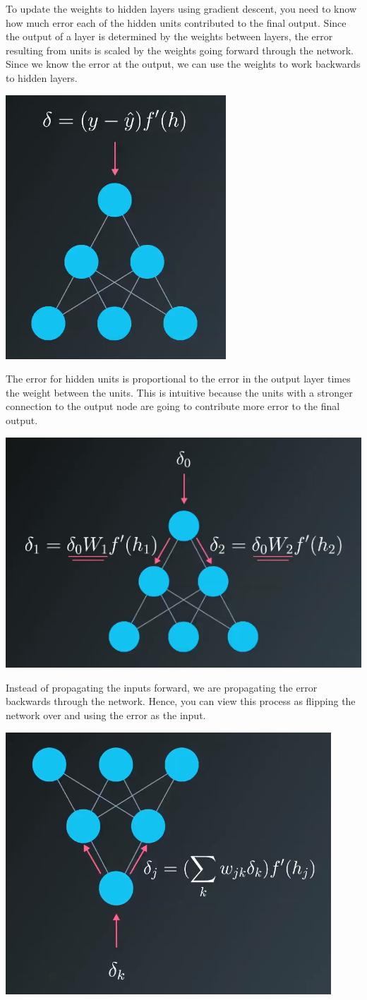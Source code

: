 To update the weights to hidden layers using gradient descent, you need to know how much error each of the hidden units contributed to the final output. Since the output of a layer is determined by the weights between layers, the error resulting from units is scaled by the weights going forward through the network. Since we know the error at the output, we can use the weights to work backwards to hidden layers.

\includegraphics[width=0.5\linewidth]{img//intro/backpropagation-2.png}

The error for hidden units is proportional to the error in the output layer times the weight between the units. This is intuitive because the units with a stronger connection to the output node are going to contribute more error to the final output.

\includegraphics[width=0.5\linewidth]{img//intro/backpropagation-3.png}

Instead of propagating the inputs forward, we are propagating the error backwards through the network. Hence, you can view this process as flipping the network over and using the error as the input. 

\includegraphics[width=0.5\linewidth]{img//intro/backpropagation-4.png}

